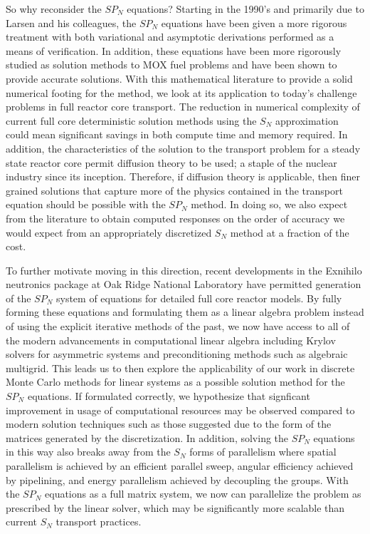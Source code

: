 So why reconsider the $SP_N$ equations? Starting in the 1990's and
primarily due to Larsen and his colleagues, the $SP_N$ equations have
been given a more rigorous treatment with both variational and
asymptotic derivations performed as a means of verification. In
addition, these equations have been more rigorously studied as
solution methods to MOX fuel problems and have been shown to provide
accurate solutions. With this mathematical literature to provide a
solid numerical footing for the method, we look at its application to
today's challenge problems in full reactor core transport. The
reduction in numerical complexity of current full core deterministic
solution methods using the $S_N$ approximation could mean significant
savings in both compute time and memory required. In addition, the
characteristics of the solution to the transport problem for a steady
state reactor core permit diffusion theory to be used; a staple of the
nuclear industry since its inception. Therefore, if diffusion theory
is applicable, then finer grained solutions that capture more of the
physics contained in the transport equation should be possible with
the $SP_N$ method. In doing so, we also expect from the literature to
obtain computed responses on the order of accuracy we would expect
from an appropriately discretized $S_N$ method at a fraction of the
cost. 

To further motivate moving in this direction, recent developments in
the Exnihilo neutronics package at Oak Ridge National Laboratory have
permitted generation of the $SP_N$ system of equations for detailed
full core reactor models. By fully forming these equations and
formulating them as a linear algebra problem instead of using the
explicit iterative methods of the past, we now have access to all of
the modern advancements in computational linear algebra including
Krylov solvers for asymmetric systems and preconditioning methods such
as algebraic multigrid. This leads us to then explore the
applicability of our work in discrete Monte Carlo methods for linear
systems as a possible solution method for the $SP_N$ equations. If
formulated correctly, we hypothesize that signficant improvement in
usage of computational resources may be observed compared to modern
solution techniques such as those suggested due to the form of the
matrices generated by the discretization. In addition, solving the
$SP_N$ equations in this way also breaks away from the $S_N$ forms of
parallelism where spatial parallelism is achieved by an efficient
parallel sweep, angular efficiency achieved by pipelining, and energy
parallelism achieved by decoupling the groups. With the $SP_N$
equations as a full matrix system, we now can parallelize the problem
as prescribed by the linear solver, which may be significantly more
scalable than current $S_N$ transport practices.

